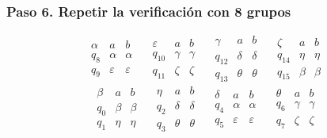 \documentclass[12pt,letterpaper]{article}
\begin{document}
\begin{enumerate}[label=\arabic*.]
\begin{enumerate}
    \subsubsection*{Paso 6. Repetir la verificación con 8 grupos}
    \[
    \begin{array}{c|cc}
      \alpha & a & b \\ \hline
      q_8 & \alpha & \alpha \\
      q_9 & \varepsilon & \varepsilon
    \end{array}
    \quad
    \begin{array}{c|cc}
      \varepsilon & a & b \\ \hline
      q_{10} & \gamma & \gamma \\
      q_{11} & \zeta & \zeta
    \end{array}
    \quad
    \begin{array}{c|cc}
      \gamma & a & b \\ \hline
      q_{12} & \delta & \delta \\
      q_{13} & \theta & \theta
    \end{array}
    \quad
    \begin{array}{c|cc}
      \zeta & a & b \\ \hline
      q_{14} & \eta & \eta \\
      q_{15} & \beta & \beta
    \end{array}
    \]
    \[
    \begin{array}{c|cc}
      \beta & a & b \\ \hline
      q_0 & \beta & \beta \\
      q_1 & \eta & \eta
    \end{array}
    \quad
    \begin{array}{c|cc}
      \eta & a & b \\ \hline
      q_2 & \delta & \delta \\
      q_3 & \theta & \theta
    \end{array}
    \quad
    \begin{array}{c|cc}
      \delta & a & b \\ \hline
      q_4 & \alpha & \alpha \\
      q_5 & \varepsilon & \varepsilon
    \end{array}
    \quad
    \begin{array}{c|cc}
      \theta & a & b \\ \hline
      q_6 & \gamma & \gamma \\
      q_7 & \zeta & \zeta
    \end{array}
    \]


\end{enumerate}
\end{enumerate}
\end{document}

